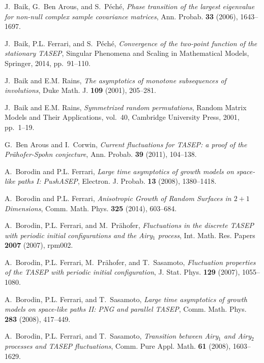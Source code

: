 \documentclass[12pt,a4paper]{article}
\numberwithin{equation}{section}
\begin{document}
\begin{thebibliography}{10}

J.~Baik, G.~{Ben Arous}, and S.~P\'ech\'e, \emph{Phase transition of the
  largest eigenvalue for non-null complex sample covariance matrices}, Ann.
  Probab. \textbf{33} (2006), 1643--1697.

J.~Baik, P.L. Ferrari, and S.~P{\'e}ch{\'e}, \emph{{Convergence of the
  two-point function of the stationary TASEP}}, {Singular Phenomena and Scaling
  in Mathematical Models}, Springer, 2014, pp.~91--110.

J.~Baik and E.M. Rains, \emph{The asymptotics of monotone subsequences of
  involutions}, Duke Math. J. \textbf{109} (2001), 205--281.

J.~Baik and E.M. Rains, \emph{Symmetrized random permutations}, Random Matrix
  Models and Their Applications, vol.~40, Cambridge University Press, 2001,
  pp.~1--19.

G.~{Ben Arous} and I.~Corwin, \emph{{Current fluctuations for TASEP: a proof of
  the Pr\"ahofer-Spohn conjecture}}, Ann. Probab. \textbf{39} (2011), 104--138.

A.~Borodin and P.L. Ferrari, \emph{{Large time asymptotics of growth models on
  space-like paths I: PushASEP}}, Electron. J. Probab. \textbf{13} (2008),
  1380--1418.

A.~Borodin and P.L. Ferrari, \emph{{Anisotropic Growth of Random Surfaces in
  $2+1$ Dimensions}}, Comm. Math. Phys. \textbf{325} (2014), 603--684.

A.~Borodin, P.L. Ferrari, and M.~Pr{\"a}hofer, \emph{{Fluctuations in the
  discrete TASEP with periodic initial configurations and the Airy$_1$
  process}}, Int. Math. Res. Papers \textbf{2007} (2007), rpm002.

A.~Borodin, P.L. Ferrari, M.~Pr{\"a}hofer, and T.~Sasamoto, \emph{{Fluctuation
  properties of the TASEP with periodic initial configuration}}, J. Stat. Phys.
  \textbf{129} (2007), 1055--1080.

A.~Borodin, P.L. Ferrari, and T.~Sasamoto, \emph{{Large time asymptotics of
  growth models on space-like paths II: PNG and parallel TASEP}}, Comm. Math.
  Phys. \textbf{283} (2008), 417--449.

A.~Borodin, P.L. Ferrari, and T.~Sasamoto, \emph{{Transition between Airy$_1$
  and Airy$_2$ processes and TASEP fluctuations}}, Comm. Pure Appl. Math.
  \textbf{61} (2008), 1603--1629.


\end{thebibliography}
\end{document}
